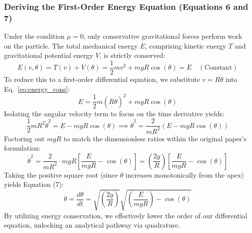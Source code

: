 \documentclass[11pt,letterpaper]{article}
\begin{document}
\subsubsection{Deriving the First-Order Energy Equation (Equations 6 and 7)}
Under the condition $\mu = 0$, only conservative gravitational forces perform work on the particle. The total mechanical energy $E$, comprising kinetic energy $T$ and gravitational potential energy $V$, is strictly conserved:
\begin{equation}\label{eq:energy_cons}
E(v, \theta) = T(v) + V(\theta) = \frac{1}{2}mv^2 + mgR\cos(\theta) = E \quad (\text{Constant})
\end{equation}
To reduce this to a first-order differential equation, we substitute $v = R\dot{\theta}$ into Eq.~\eqref{eq:energy_cons}:
\begin{equation*}
E = \frac{1}{2}m(R\dot{\theta})^2 + mgR\cos(\theta)
\end{equation*}
Isolating the angular velocity term to focus on the time derivative yields:
\begin{equation*}
\frac{1}{2}mR^2\dot{\theta}^2 = E - mgR\cos(\theta) \implies \dot{\theta}^2 = \frac{2}{mR^2}\left(E - mgR\cos(\theta)\right)
\end{equation*}
Factoring out $mgR$ to match the dimensionless ratios within the original paper's formulation:
\begin{equation*}
\dot{\theta}^2 = \frac{2}{mR^2} \cdot mgR \left[\frac{E}{mgR} - \cos(\theta)\right] = \left(\frac{2g}{R}\right)\left[\frac{E}{mgR} - \cos(\theta)\right]
\end{equation*}
Taking the positive square root (since $\theta$ increases monotonically from the apex) yields Equation (7):
\begin{equation}\label{eq:eq7_derived}
\dot{\theta} = \frac{d\theta}{dt} = \sqrt{\left(\frac{2g}{R}\right)}\sqrt{\left(\frac{E}{mgR}\right) - \cos(\theta)}
\end{equation}
By utilizing energy conservation, we effectively lower the order of our differential equation, unlocking an analytical pathway via quadrature.
\end{document}
